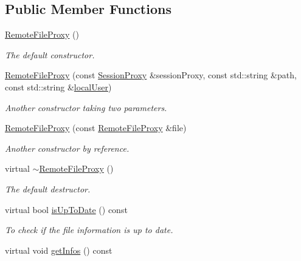 \subsection*{Public Member Functions}
\begin{DoxyCompactItemize}
\item 
\hypertarget{classRemoteFileProxy_a7104c1f0545b44e3748147dc47d71e80}{
\hyperlink{classRemoteFileProxy_a7104c1f0545b44e3748147dc47d71e80}{RemoteFileProxy} ()}
\label{classRemoteFileProxy_a7104c1f0545b44e3748147dc47d71e80}

\begin{DoxyCompactList}\small\item\em The default constructor. \item\end{DoxyCompactList}\item 
\hyperlink{classRemoteFileProxy_abe7ccbed6e872df7072f2f8c93daad4a}{RemoteFileProxy} (const \hyperlink{classSessionProxy}{SessionProxy} \&sessionProxy, const std::string \&path, const std::string \&\hyperlink{classRemoteFileProxy_aa8cea3d20ace6f9402a54d4c56c93bc5}{localUser})
\begin{DoxyCompactList}\small\item\em Another constructor taking two parameters. \item\end{DoxyCompactList}\item 
\hyperlink{classRemoteFileProxy_af7a017d9da43872ee40e2a4f344533d1}{RemoteFileProxy} (const \hyperlink{classRemoteFileProxy}{RemoteFileProxy} \&file)
\begin{DoxyCompactList}\small\item\em Another constructor by reference. \item\end{DoxyCompactList}\item 
\hypertarget{classRemoteFileProxy_a2fbc018e03120c380e135a26335734b0}{
virtual \hyperlink{classRemoteFileProxy_a2fbc018e03120c380e135a26335734b0}{$\sim$RemoteFileProxy} ()}
\label{classRemoteFileProxy_a2fbc018e03120c380e135a26335734b0}

\begin{DoxyCompactList}\small\item\em The default destructor. \item\end{DoxyCompactList}\item 
virtual bool \hyperlink{classRemoteFileProxy_a5f7b3b9df85eb3933c9d6c145277828c}{isUpToDate} () const 
\begin{DoxyCompactList}\small\item\em To check if the file information is up to date. \item\end{DoxyCompactList}\item 
\hypertarget{classRemoteFileProxy_a14b443643580d08a5650c095fc80fd71}{
virtual void \hyperlink{classRemoteFileProxy_a14b443643580d08a5650c095fc80fd71}{getInfos} () const }
\label{classRemoteFileProxy_a14b443643580d08a5650c095fc80fd71}


\end{DoxyCompactItemize}
